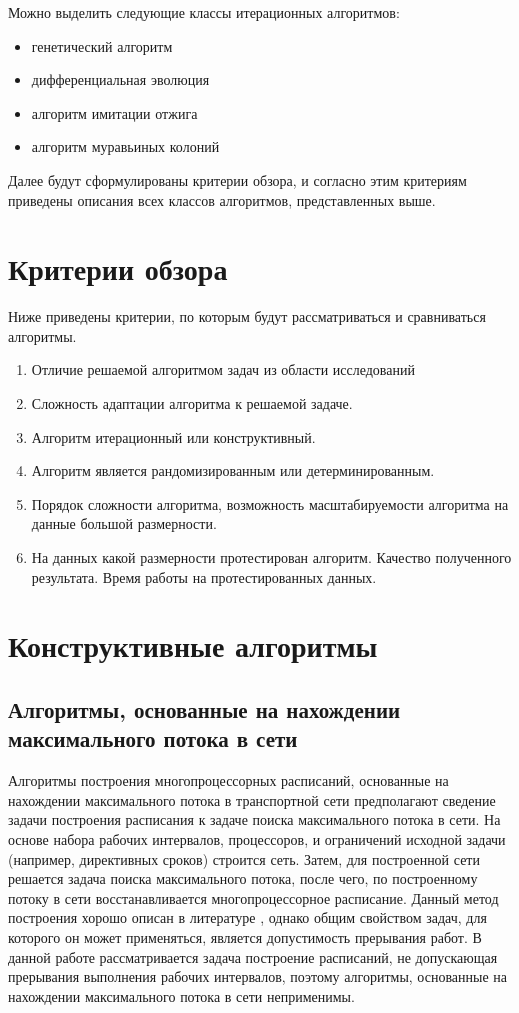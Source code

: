 \documentclass{article}
\begin{document}
Можно выделить следующие классы итерационных алгоритмов:
\begin{itemize}
  \item генетический алгоритм
  \item дифференциальная эволюция
  \item алгоритм имитации отжига
  \item алгоритм муравьиных колоний
\end{itemize}
Далее будут сформулированы критерии обзора, и согласно этим критериям приведены описания всех классов алгоритмов, представленных выше.
\newpage

\section{Критерии обзора}

Ниже приведены критерии, по которым будут рассматриваться и сравниваться алгоритмы.
\begin{enumerate}
  \item Отличие решаемой алгоритмом задач из области исследований
  \item Сложность адаптации алгоритма к решаемой задаче.
  \item Алгоритм итерационный или конструктивный.
  \item Алгоритм является рандомизированным или детерминированным.
  \item Порядок сложности алгоритма, возможность масштабируемости алгоритма на данные большой размерности.
  \item На данных какой размерности протестирован алгоритм. Качество полученного результата. Время работы на протестированных данных.
\end{enumerate}
\newpage


\section{Конструктивные алгоритмы}
\subsection{Алгоритмы, основанные на нахождении максимального потока в сети}
Алгоритмы построения многопроцессорных расписаний, основанные на нахождении максимального потока в транспортной сети \cite{MaxFlowProblem} предполагают сведение задачи построения расписания к задаче поиска максимального потока в сети. На основе набора рабочих интервалов, процессоров, и ограничений исходной задачи (например, директивных сроков) строится сеть. Затем, для построенной сети решается задача поиска максимального потока, после чего, по построенному потоку в сети восстанавливается многопроцессорное расписание. Данный метод построения хорошо описан в литературе \cite{Stone_1977}, однако общим свойством задач, для которого он может применяться, является допустимость прерывания работ. В данной работе рассматривается задача построение расписаний, не допускающая прерывания выполнения рабочих интервалов, поэтому алгоритмы, основанные на нахождении максимального потока в сети неприменимы.
\end{document}
